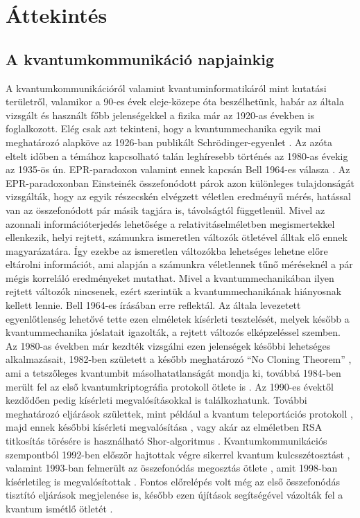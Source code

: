 \chapter{Áttekintés}

\section{A kvantumkommunikáció napjainkig}

A kvantumkommunikációról valamint kvantuminformatikáról mint kutatási területről, valamikor a 90-es évek eleje-közepe óta beszélhetünk, habár az általa vizsgált és használt főbb jelenségekkel a fizika már az 1920-as években is foglalkozott. Elég csak azt tekinteni, hogy a kvantummechanika egyik mai meghatározó alapköve az 1926-ban publikált Schrödinger-egyenlet \cite{schrodinger1926undulatory}. Az azóta eltelt időben a témához kapcsolható talán leghíresebb történés az 1980-as évekig az 1935-ös ún. EPR-paradoxon \cite{einstein1935can} valamint ennek kapcsán Bell 1964-es válasza \cite{bellt1964einstein}. Az EPR-paradoxonban Einsteinék összefonódott párok azon különleges tulajdonságát vizsgálták, hogy az egyik részecskén elvégzett véletlen eredményű mérés, hatással van az összefonódott pár másik tagjára is, távolságtól függetlenül.  Mivel az azonnali információterjedés lehetősége a relativitáselméletben megismertekkel ellenkezik, helyi rejtett, számunkra ismeretlen változók ötletével álltak elő ennek magyarázatára. Így ezekbe az ismeretlen változókba lehetséges lehetne előre eltárolni információt, ami alapján a számunkra véletlennek tűnő méréseknél a pár mégis korreláló eredményeket mutathat. Mivel a kvantummechanikában ilyen rejtett változók nincsenek, ezért szerintük a kvantummechanikának hiányosnak kellett lennie. Bell 1964-es írásában erre reflektál. Az általa levezetett egyenlőtlenség lehetővé tette ezen elméletek kísérleti tesztelését, melyek később a kvantummechanika jóslatait igazolták, a rejtett változós elképzeléssel szemben.\\
 Az 1980-as években már kezdték vizsgálni ezen jelenségek későbbi lehetséges alkalmazásait, 1982-ben született a később meghatározó ``No Cloning Theorem'' \cite{wootters1982single}, ami a tetszőleges kvantumbit másolhatatlanságát mondja ki, továbbá 1984-ben merült fel az első kvantumkriptográfia protokoll ötlete is \cite{BB84}. Az 1990-es évektől kezdődően pedig kísérleti megvalósításokkal is találkozhatunk. További meghatározó eljárások születtek, mint például a kvantum teleportációs protokoll \cite{bennett1993teleporting}, majd ennek későbbi kísérleti megvalósítása \cite{bouwmeester1997experimental}, vagy akár az elméletben RSA titkosítás törésére is használható Shor-algoritmus \cite{shor1999polynomial}. Kvantumkommunikációs szempontból 1992-ben először hajtottak végre sikerrel kvantum kulcsszétosztást \cite{bennett1992experimental}, valamint 1993-ban felmerült az összefonódás megosztás ötlete \cite{zukowski1993event}, amit 1998-ban kísérletileg is megvalósítottak \cite{pan1998experimental}. Fontos előrelépés volt még az első összefonódás tisztító eljárások \cite{bennett1996purification}\cite{deutsch1996quantum} megjelenése is, később ezen újítások segítségével vázolták fel a kvantum ismétlő ötletét \cite{briegel1998quantum}. \\
